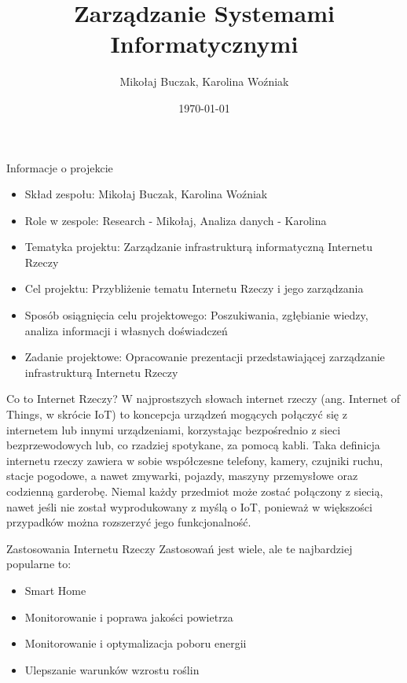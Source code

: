 \documentclass{beamer}
\title[M4.6]{Zarządzanie Systemami Informatycznymi}
\author{Mikołaj Buczak, Karolina Woźniak}
\institute{Politechnika Śląska}
\date{\today}
\begin{document}
\begin{frame}
  \titlepage
\end{frame}

\begin{frame}{Informacje o projekcie}
    \begin{itemize}
        \item Skład zespołu: Mikołaj Buczak, Karolina Woźniak\\
        \item Role w zespole: Research - Mikołaj, Analiza danych - Karolina\\
        \item Tematyka projektu: Zarządzanie infrastrukturą informatyczną Internetu Rzeczy\\
        \item Cel projektu: Przybliżenie tematu Internetu Rzeczy i jego zarządzania\\
        \item Sposób osiągnięcia celu projektowego: Poszukiwania, zgłębianie wiedzy, analiza informacji i własnych doświadczeń\\
        \item Zadanie projektowe: Opracowanie prezentacji przedstawiającej zarządzanie infrastrukturą Internetu Rzeczy
    \end{itemize}
\end{frame}

\begin{frame}{Co to Internet Rzeczy?}
    W najprostszych słowach internet rzeczy (ang. Internet of Things, w skrócie IoT) to koncepcja urządzeń mogących połączyć się z internetem lub innymi urządzeniami, korzystając bezpośrednio z sieci bezprzewodowych lub, co rzadziej spotykane, za pomocą kabli. Taka definicja internetu rzeczy zawiera w sobie współczesne telefony, kamery, czujniki ruchu, stacje pogodowe, a nawet zmywarki, pojazdy, maszyny przemysłowe oraz codzienną garderobę. Niemal każdy przedmiot może zostać połączony z siecią, nawet jeśli nie został wyprodukowany z myślą o IoT, ponieważ w większości przypadków można rozszerzyć jego funkcjonalność.
\end{frame}

\begin{frame}{Zastosowania Internetu Rzeczy}
    Zastosowań jest wiele, ale te najbardziej popularne to:
    \begin{itemize}
        \item Smart Home
        \item Monitorowanie i poprawa jakości powietrza
        \item Monitorowanie i optymalizacja poboru energii
        \item Ulepszanie warunków wzrostu roślin
    \end{itemize}
\end{frame}
\end{document}
